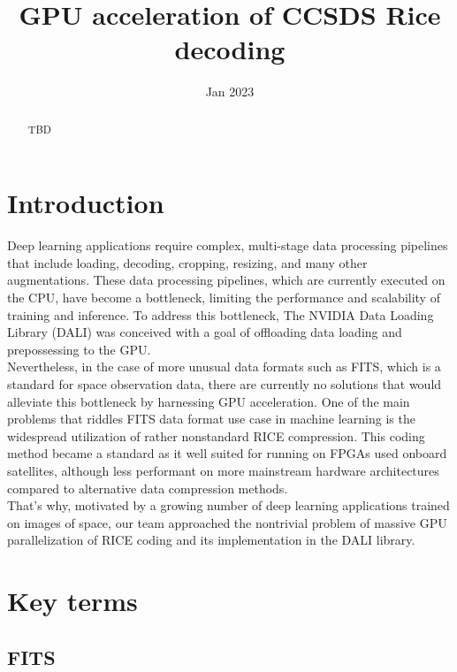 \documentclass[licencjacka,en]{pracamgr}
\title{GPU acceleration of CCSDS Rice decoding}
\date{Jan 2023}
\begin{document}
\maketitle 

\begin{abstract}
    TBD
\end{abstract}

\tableofcontents

\chapter*{Introduction}
Deep learning applications require complex, multi-stage data processing pipelines that include loading, decoding, cropping, resizing, and many other augmentations. These data processing pipelines, which are currently executed on the CPU, have become a bottleneck, limiting the performance and scalability of training and inference. To address this bottleneck, The NVIDIA Data Loading Library (DALI) was conceived with a goal of offloading data loading and prepossessing to the GPU. \\

Nevertheless, in the case of more unusual data formats such as FITS, which is a standard for space observation data, there are currently no solutions that would alleviate this bottleneck by harnessing GPU acceleration. One of the main problems that riddles FITS data format use case in  machine learning is the widespread utilization of rather nonstandard RICE compression. This coding method became a standard as it well suited for running on FPGAs used onboard satellites, although less performant on more mainstream hardware architectures compared to alternative data compression methods. \\ 
That's why, motivated by a growing number of deep learning applications trained on images of space, our team approached the nontrivial problem of massive GPU parallelization of RICE coding and its implementation in the DALI library.  




\chapter{Key terms}\label{r:pojecia}

\section{FITS}
\end{document}
